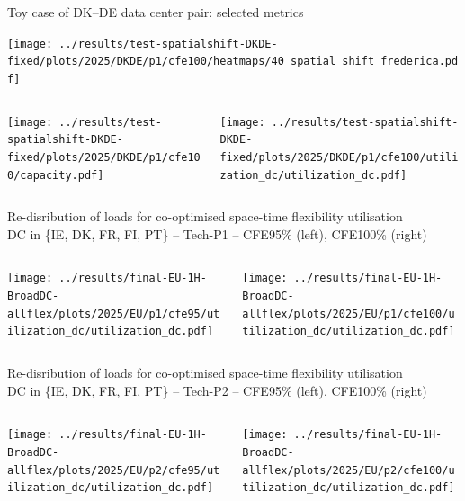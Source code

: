 \begin{frame}{Toy case of DK--DE data center pair: selected metrics}

  \centering
  \texttt{[image: ../results/test-spatialshift-DKDE-fixed/plots/2025/DKDE/p1/cfe100/heatmaps/40\_spatial\_shift\_frederica.pdf]}

  \begin{columns}[T]
    \begin{column}{6cm}
      \centering
      \texttt{[image: ../results/test-spatialshift-DKDE-fixed/plots/2025/DKDE/p1/cfe100/capacity.pdf]}
  \end{column}
  \begin{column}{6cm}
    \centering
    \texttt{[image: ../results/test-spatialshift-DKDE-fixed/plots/2025/DKDE/p1/cfe100/utilization\_dc/utilization\_dc.pdf]}
  \end{column}
  \end{columns}

\end{frame}


\begin{frame}{Re-disribution of loads for co-optimised space-time flexibility utilisation \\
  DC in \{IE, DK, FR, FI, PT\} -- Tech-P1 -- CFE95\% (left), CFE100\% (right)}

  \begin{columns}[T]
  \begin{column}{6cm}
    \centering
    \texttt{[image: ../results/final-EU-1H-BroadDC-allflex/plots/2025/EU/p1/cfe95/utilization\_dc/utilization\_dc.pdf]}
  \end{column}

  \begin{column}{6cm}
    \centering
    \texttt{[image: ../results/final-EU-1H-BroadDC-allflex/plots/2025/EU/p1/cfe100/utilization\_dc/utilization\_dc.pdf]}  
  \end{column}
  \end{columns}

\end{frame}


\begin{frame}{Re-disribution of loads for co-optimised space-time flexibility utilisation \\
  DC in \{IE, DK, FR, FI, PT\} -- Tech-P2 -- CFE95\% (left), CFE100\% (right)}

  \begin{columns}[T]
  \begin{column}{6cm}
    \centering
    \texttt{[image: ../results/final-EU-1H-BroadDC-allflex/plots/2025/EU/p2/cfe95/utilization\_dc/utilization\_dc.pdf]}
  \end{column}

  \begin{column}{6cm}
    \centering
    \texttt{[image: ../results/final-EU-1H-BroadDC-allflex/plots/2025/EU/p2/cfe100/utilization\_dc/utilization\_dc.pdf]}  
  \end{column}
  \end{columns}

\end{frame}

